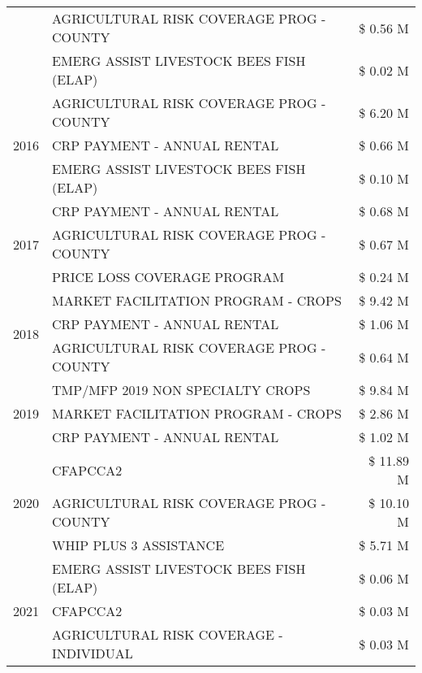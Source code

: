 \begin{tabular}{llr}
 & AGRICULTURAL RISK COVERAGE PROG - COUNTY & \$ 0.56 M \\
 & EMERG ASSIST LIVESTOCK BEES FISH (ELAP) & \$ 0.02 M \\
\cline{1-3}
\multirow[t]{3}{*}{2016} & AGRICULTURAL RISK COVERAGE PROG - COUNTY & \$ 6.20 M \\
 & CRP PAYMENT - ANNUAL RENTAL & \$ 0.66 M \\
 & EMERG ASSIST LIVESTOCK BEES FISH (ELAP) & \$ 0.10 M \\
\cline{1-3}
\multirow[t]{3}{*}{2017} & CRP PAYMENT - ANNUAL RENTAL & \$ 0.68 M \\
 & AGRICULTURAL RISK COVERAGE PROG - COUNTY & \$ 0.67 M \\
 & PRICE LOSS COVERAGE PROGRAM & \$ 0.24 M \\
\cline{1-3}
\multirow[t]{3}{*}{2018} & MARKET FACILITATION PROGRAM - CROPS & \$ 9.42 M \\
 & CRP PAYMENT - ANNUAL RENTAL & \$ 1.06 M \\
 & AGRICULTURAL RISK COVERAGE PROG - COUNTY & \$ 0.64 M \\
\cline{1-3}
\multirow[t]{3}{*}{2019} & TMP/MFP 2019 NON SPECIALTY CROPS & \$ 9.84 M \\
 & MARKET FACILITATION PROGRAM - CROPS & \$ 2.86 M \\
 & CRP PAYMENT - ANNUAL RENTAL & \$ 1.02 M \\
\cline{1-3}
\multirow[t]{3}{*}{2020} & CFAPCCA2 & \$ 11.89 M \\
 & AGRICULTURAL RISK COVERAGE PROG - COUNTY & \$ 10.10 M \\
 & WHIP PLUS 3 ASSISTANCE & \$ 5.71 M \\
\cline{1-3}
\multirow[t]{3}{*}{2021} & EMERG ASSIST LIVESTOCK BEES FISH (ELAP) & \$ 0.06 M \\
 & CFAPCCA2 & \$ 0.03 M \\
 & AGRICULTURAL RISK COVERAGE - INDIVIDUAL & \$ 0.03 M \\
\cline{1-3}
\bottomrule
\end{tabular}

